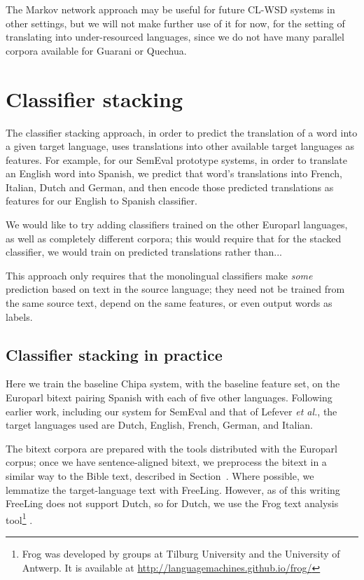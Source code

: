 The Markov network approach may be useful for future CL-WSD systems in other
settings, but we will not make further use of it for now, for the setting of
translating into under-resourced languages, since we do not have many parallel
corpora available for Guarani or Quechua.

\section{Classifier stacking}
The classifier stacking approach, in order to predict the translation of a word
into a given target language, uses translations into other available target
languages as features.
For example, for our SemEval prototype systems, in order to translate an
English word into Spanish, we predict that word's translations into French,
Italian, Dutch and German, and then encode those predicted translations as
features for our English to Spanish classifier.


We would like to try adding classifiers trained on the other Europarl
languages, as well as completely different corpora; this would require that for
the stacked classifier, we would train on predicted translations rather than...

This approach only requires that the monolingual classifiers make \emph{some}
prediction based on text in the source language; they need not be trained from
the same source text, depend on the same features, or even output words as
labels.

\subsection{Classifier stacking in practice}
Here we train the baseline Chipa system, with the baseline feature set, on the
Europarl bitext pairing Spanish with each of five other languages. Following
earlier work, including our system for SemEval and that of Lefever \emph{et
al.}, the target languages used are Dutch, English, French, German, and
Italian.

The bitext corpora are prepared with the tools distributed with the Europarl
corpus; once we have sentence-aligned bitext, we preprocess the bitext in a
similar way to the Bible text, described in
Section~\label{sec:datasetsandpreprocessing}. Where possible, we lemmatize the
target-language text with FreeLing. However, as of this writing FreeLing does
not support Dutch, so for Dutch, we use the Frog text analysis
tool\footnote{Frog was developed by groups at Tilburg
University and the University of Antwerp. It is available at
\url{http://languagemachines.github.io/frog/}} \cite{tadpole2007}.

